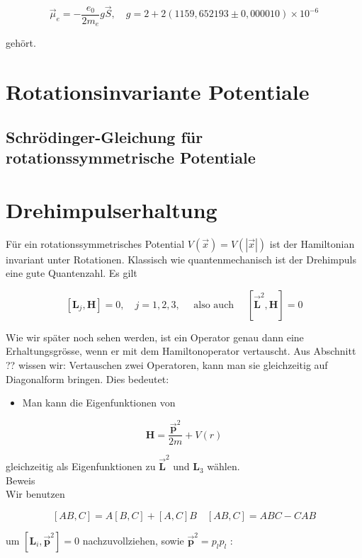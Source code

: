 \documentclass[10pt, letterpaper]{article}
\begin{document}
$$
\vec{\mu}_{e}=-\frac{e_{0}}{2 m_{e}} g \vec{S}, \quad g=2+2(1159,652193 \pm 0,000010) \times 10^{-6}
$$

gehört.






\pagebreak






\section{Rotationsinvariante Potentiale}

\subsection*{Schrödinger-Gleichung für rotationssymmetrische Potentiale}
\section*{Drehimpulserhaltung}
Für ein rotationssymmetrisches Potential $V(\vec{x})=V(|\vec{x}|)$ ist der Hamiltonian invariant unter Rotationen. Klassisch wie quantenmechanisch ist der Drehimpuls eine gute Quantenzahl. Es gilt

$$
\left[\mathbf{L}_{j}, \mathbf{H}\right]=0, \quad j=1,2,3, \quad \text { also auch } \quad\left[\overrightarrow{\mathbf{L}}^{2}, \mathbf{H}\right]=0
$$

Wie wir später noch sehen werden, ist ein Operator genau dann eine Erhaltungsgrösse, wenn er mit dem Hamiltonoperator vertauscht. Aus Abschnitt ?? wissen wir: Vertauschen zwei Operatoren, kann man sie gleichzeitig auf Diagonalform bringen. Dies bedeutet:

\begin{itemize}
  \item Man kann die Eigenfunktionen von
\end{itemize}

$$
\mathbf{H}=\frac{\overrightarrow{\mathbf{p}}^{2}}{2 m}+V(r)
$$

gleichzeitig als Eigenfunktionen zu $\overrightarrow{\mathbf{L}}^{2}$ und $\mathbf{L}_{3}$ wählen.\\
Beweis\\
Wir benutzen

$$
[A B, C]=A[B, C]+[A, C] B \quad[A B, C]=A B C-C A B
$$

um $\left[\mathbf{L}_{i}, \overrightarrow{\mathbf{p}}^{2}\right]=0$ nachzuvollziehen, sowie $\overrightarrow{\mathbf{p}}^{2}=p_{l} p_{l}$ :
\end{document}
